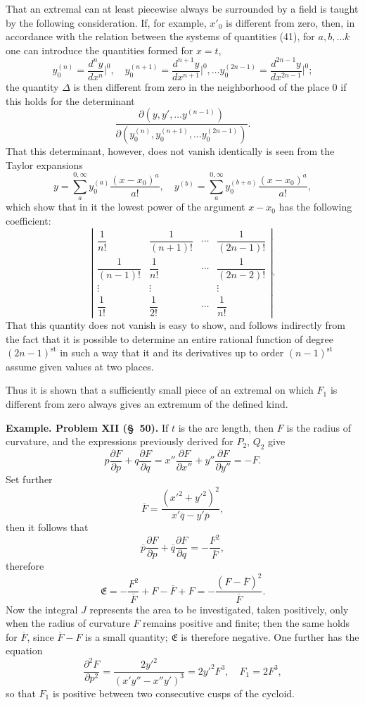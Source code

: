 \documentclass[11pt,a4paper,leqno]{article}
\begin{document}
That an extremal can at least piecewise always be surrounded by a field is taught by the following consideration. If, for example, $x'_0$ is different from zero, then, in accordance with the relation between the systems of quantities (41), for $a,b,\ldots k$ one can introduce the quantities formed for $x=t$,
\[
y_0^{(n)}=\frac{d^ny}{dx^n}\bigg|^0,\quad
y_0^{(n+1)}=\frac{d^{n+1}y}{dx^{n+1}}\bigg|^0,\ldots
y_0^{(2n-1)}=\frac{d^{2n-1}y}{dx^{2n-1}}\bigg|^0;
\]
the quantity $\Delta$ is then different from zero in the neighborhood of the place 0 if this holds for the determinant
\[
\frac{\partial(y,y',\ldots y^{(n-1)})}
{\partial(y_0^{(n)},y_0^{(n+1)},\ldots y_0^{(2n-1)})}.
\]
That this determinant, however, does not vanish identically is seen from the Taylor expansions
\[
y=\sum_a^{0,\infty}y_0^{(a)}\frac{(x-x_0)^a}{a!},\quad
y^{(b)}=\sum_a^{0,\infty}y_0^{(b+a)}\frac{(x-x_0)^a}{a!},
\]
which show that in it the lowest power of the argument $x-x_0$ has the following coefficient:
\[
\left|
\begin{array}{cccc}
\dfrac1{n!}&\dfrac1{(n+1)!}&\cdots&\dfrac1{(2n-1)!}\\[2mm]
\dfrac1{(n-1)!}&\dfrac1{n!}&\cdots&\dfrac1{(2n-2)!}\\
\vdots&\vdots&&\vdots\\
\dfrac1{1!}&\dfrac1{2!}&\cdots&\dfrac1{n!}
\end{array}
\right|.
\]
That this quantity does not vanish is easy to show, and follows indirectly from the fact that it is possible to determine an entire rational function of degree $(2n-1)^{\mathrm{st}}$ in such a way that it and its derivatives up to order $(n-1)^{\mathrm{st}}$ assume given values at two places.

Thus it is shown that a sufficiently small piece of an extremal on which $F_1$ is different from zero always gives an extremum of the defined kind.

\noindent\textbf{Example. Problem XII (\S~50).} If $t$ is the arc length, then $F$ is the radius of curvature, and the expressions previously derived for $P_2$, $Q_2$ give
\[
p\frac{\partial F}{\partial p}+q\frac{\partial F}{\partial q}
=x''\frac{\partial F}{\partial x''}+y''\frac{\partial F}{\partial y''}=-F.
\]
Set further
\[
\overline{F}=\frac{(x'^2+y'^2)^2}{x'\overline{q}-y'\overline{p}},
\]
then it follows that
\[
\overline{p}\frac{\partial F}{\partial p}
+\overline{q}\frac{\partial F}{\partial q}
=-\frac{F^2}{\overline{F}},
\]
therefore
\[
\mathfrak{E}=-\frac{F^2}{\overline{F}}+F-\overline{F}+F
=-\frac{(F-\overline{F})^2}{\overline{F}}.
\]
Now the integral $J$ represents the area to be investigated, taken positively, only when the radius of curvature $F$ remains positive and finite; then the same holds for $\overline{F}$, since $\overline{F}-F$ is a small quantity; $\mathfrak{E}$ is therefore negative. One further has the equation
\[
\frac{\partial^2F}{\partial p^2}
=\frac{2y'^2}{(x'y''-x''y')^3}
=2y'^2F^3,\quad F_1=2F^3,
\]
so that $F_1$ is positive between two consecutive cusps of the cycloid.
\end{document}

